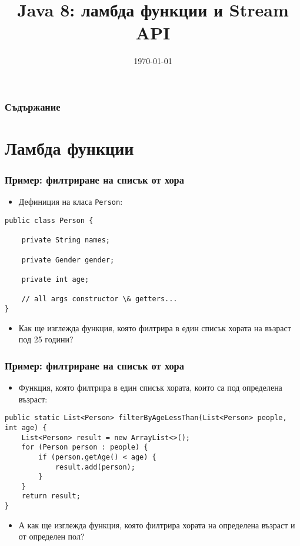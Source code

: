 \documentclass[ignorenonframetext, hyperref=unicode,compress,pdflatex]{beamer}
\title{Java 8: ламбда функции и Stream API}
\date{\today}
\begin{document}
\frame{\titlepage}


\begin{frame}
\frametitle{Съдържание}
\tableofcontents %
\end{frame}


\section{Ламбда функции}

\begin{frame}[containsverbatim]\frametitle{Пример: филтриране на списък от хора}
\begin{itemize}
\item Дефиниция на класа \lstinline{Person}:
\end{itemize}
\begin{lstlisting}
public class Person {

	private String names;

	private Gender gender;

	private int age;

    // all args constructor \& getters...
}
\end{lstlisting}
\begin{itemize}
\item Как ще изглежда функция, която филтрира в един списък хората на възраст
под 25 години?
\end{itemize}
\end{frame}


\begin{frame}[containsverbatim]\frametitle{Пример: филтриране на списък от хора}
\begin{itemize}
\item Функция, която филтрира в един списък хората, които са под определена
възраст:
\end{itemize}
\begin{lstlisting}
public static List<Person> filterByAgeLessThan(List<Person> people, int age) {
	List<Person> result = new ArrayList<>();
	for (Person person : people) {
		if (person.getAge() < age) {
			result.add(person);
		}
	}
	return result;
}
\end{lstlisting}
\begin{itemize}
\item А как ще изглежда функция, която филтрира хората на определена възраст и
от определен пол?
\end{itemize}
\end{frame}
\end{document}
